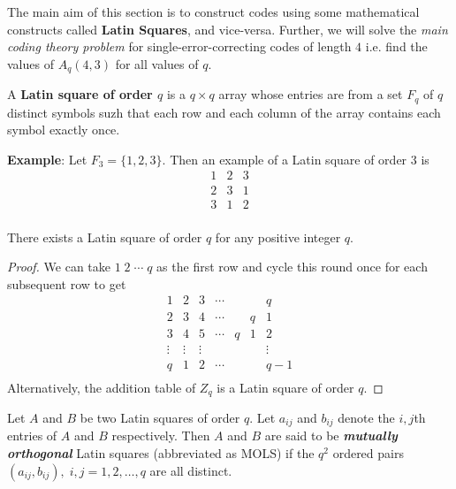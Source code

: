 \documentclass[../main.tex]{subfiles}
\begin{document}
The main aim of this section is to construct codes using some mathematical constructs called \textbf{Latin Squares}, and vice-versa. Further, we will solve the \textit{main coding theory problem} for single-error-correcting codes of length $4$ i.e. find the values of $A_q(4,3)$ for all values of $q$.

\begin{defn}
	A \textbf{Latin square of order $q$} is a $q\times q$ array whose entries are from a set $F_q$ of $q$ distinct symbols suzh that each row and each column of the array contains each symbol exactly once.
\end{defn}

\textbf{Example}: Let $F_3 = \{1,2,3\}$. Then an example of a Latin square of order $3$ is
\[
	\begin{array}{ccc}
		1 & 2 & 3\\
		2 & 3 & 1\\
		3 & 1 & 2\\
	\end{array}
\]

\begin{thm}
	There exists a Latin square of order $q$ for any positive integer $q$.
\end{thm}

\begin{proof}
	We can take $1\;2\;\cdots\; q$ as the first row and cycle this round once for each subsequent row to get 
	\[
		\begin{array}{ccccccc}
			1 & 2 & 3 & \cdots & & & q\\
			2 & 3 & 4 & \cdots & & q & 1\\
			3 & 4 & 5 & \cdots & q & 1 & 2\\
			\vdots & \vdots & \vdots & & & & \vdots \\
			q & 1 & 2 & \cdots & & & q-1\\ 
		\end{array}
	\]
	Alternatively, the addition table of $Z_q$ is a Latin square of order $q$.
\end{proof}

\begin{defn}
	Let $A$ and $B$ be two Latin squares of order $q$. Let $a_{ij}$ and $b_{ij}$ denote the $i,j$th entries of $A$ and $B$ respectively. Then $A$ and $B$ are said to be \textbf{\emph{mutually orthogonal}} Latin squares (abbreviated as MOLS) if the $q^2$ ordered pairs $(a_{ij}, b_{ij}),\;i,j=1,2,\ldots,q$ are all distinct.
\end{defn}
\end{document}
